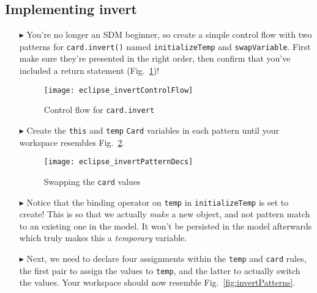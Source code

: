 \newpage
\hypertarget{invertCard tex}{}
\subsection{Implementing invert}
\texHeader

\begin{itemize}

\item[$\blacktriangleright$] You're no longer an SDM beginner, so create a simple control flow with two patterns for \texttt{card.invert()} named
\texttt{initializeTemp} and \texttt{swapVariable}. First make sure they're presented in the right order, then confirm that you've included a return statement
(Fig.~\ref{fig:eclipse_invert})!

\begin{figure}[htbp]
\begin{center}
  \texttt{[image: eclipse\_invertControlFlow]}
  \caption{Control flow for \texttt{card.invert}}  
  \label{fig:eclipse_invert}
\end{center}
\end{figure}

\item[$\blacktriangleright$] Create the \texttt{this} and \texttt{temp} \texttt{Card} variables in each pattern until your workspace resembles
Fig.~\ref{fig:invertPatternsDecs}.

\begin{figure}[htbp]
\begin{center}
  \texttt{[image: eclipse\_invertPatternDecs]}
  \caption{Swapping the \texttt{card} values}  
  \label{fig:invertPatternsDecs}
\end{center}
\end{figure}

\item[$\blacktriangleright$] Notice that the binding operator on \texttt{temp} in \texttt{initializeTemp} is set to create! This is so that we actually
\emph{make} a new object, and not pattern match to an existing one in the model. It won't be persisted in the model afterwards which truly makes this a
\emph{temporary} variable.

\item[$\blacktriangleright$] Next, we need to declare four assignments within the \texttt{temp} and \texttt{card} rules, the first pair to assign the values to
\texttt{temp}, and the latter to actually switch the values. Your workspace should now resemble Fig.~\ref{fig:invertPatterns}.


\end{itemize}
